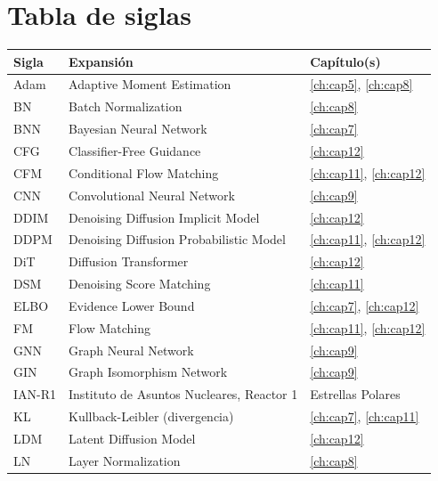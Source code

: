 \section*{Tabla de siglas}

\begin{center}
\small
\begin{tabular}{ll p{8cm}}
\toprule
\textbf{Sigla} & \textbf{Expansión} & \textbf{Capítulo(s)} \\
\midrule
Adam   & Adaptive Moment Estimation          & \ref{ch:cap5}, \ref{ch:cap8} \\
BN     & Batch Normalization                 & \ref{ch:cap8} \\
BNN    & Bayesian Neural Network             & \ref{ch:cap7} \\
CFG    & Classifier-Free Guidance            & \ref{ch:cap12} \\
CFM    & Conditional Flow Matching           & \ref{ch:cap11}, \ref{ch:cap12} \\
CNN    & Convolutional Neural Network        & \ref{ch:cap9} \\
DDIM   & Denoising Diffusion Implicit Model  & \ref{ch:cap12} \\
DDPM   & Denoising Diffusion Probabilistic Model & \ref{ch:cap11}, \ref{ch:cap12} \\
DiT    & Diffusion Transformer               & \ref{ch:cap12} \\
DSM    & Denoising Score Matching            & \ref{ch:cap11} \\
ELBO   & Evidence Lower Bound                & \ref{ch:cap7}, \ref{ch:cap12} \\
FM     & Flow Matching                       & \ref{ch:cap11}, \ref{ch:cap12} \\
GNN    & Graph Neural Network                & \ref{ch:cap9} \\
GIN    & Graph Isomorphism Network           & \ref{ch:cap9} \\
IAN-R1 & Instituto de Asuntos Nucleares, Reactor 1 & Estrellas Polares \\
KL     & Kullback-Leibler (divergencia)      & \ref{ch:cap7}, \ref{ch:cap11} \\
LDM    & Latent Diffusion Model              & \ref{ch:cap12} \\
LN     & Layer Normalization                 & \ref{ch:cap8} \\

\end{tabular}
\end{center}
